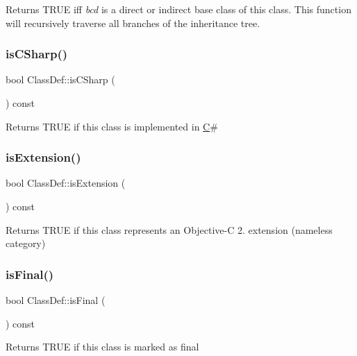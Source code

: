 Returns T\+R\+UE iff {\itshape bcd} is a direct or indirect base class of this class. This function will recursively traverse all branches of the inheritance tree. \mbox{\label{class_class_def_af721bca7d2823fcbaacfffb033f8b0a4}} 
\subsubsection{\texorpdfstring{isCSharp()}{isCSharp()}}
{\footnotesize\ttfamily bool Class\+Def\+::is\+C\+Sharp (\begin{DoxyParamCaption}{ }\end{DoxyParamCaption}) const}

Returns T\+R\+UE if this class is implemented in \mbox{\hyperlink{class_c}{C}}\# \mbox{\label{class_class_def_aa99ab74b431ee591f88e23d66c50b479}} 
\subsubsection{\texorpdfstring{isExtension()}{isExtension()}}
{\footnotesize\ttfamily bool Class\+Def\+::is\+Extension (\begin{DoxyParamCaption}{ }\end{DoxyParamCaption}) const}

Returns T\+R\+UE if this class represents an Objective-\/C 2. extension (nameless category) \mbox{\label{class_class_def_af9b24ced8a63862c803cee39e97cee45}} 
\subsubsection{\texorpdfstring{isFinal()}{isFinal()}}
{\footnotesize\ttfamily bool Class\+Def\+::is\+Final (\begin{DoxyParamCaption}{ }\end{DoxyParamCaption}) const}

Returns T\+R\+UE if this class is marked as final \mbox{\label{class_class_def_a799b9febc429fed874db28d75475ba97}} 
